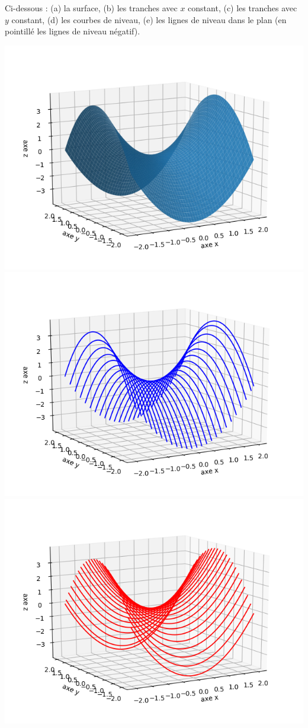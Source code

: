 \begin{exemple}{}{}
	Ci-dessous : (a) la surface, (b) les tranches avec $x$ constant, (c) les tranches avec $y$ constant, (d) les courbes de niveau, (e) les lignes de niveau dans le plan (en pointillé les lignes de niveau négatif).
	\begin{center}
		\includegraphics[scale=\myscale,scale=0.5]{figures/fonctions-quadra-3a}
		\includegraphics[scale=\myscale,scale=0.5]{figures/fonctions-quadra-3b}
		\includegraphics[scale=\myscale,scale=0.5]{figures/fonctions-quadra-3c}

\end{center}
\end{exemple}
